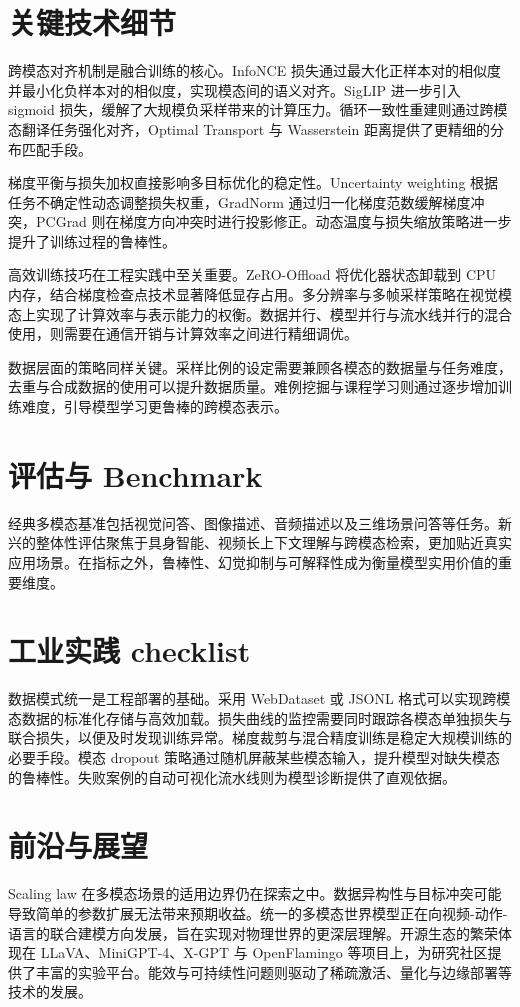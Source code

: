 \chapter{关键技术细节}
跨模态对齐机制是融合训练的核心。InfoNCE 损失通过最大化正样本对的相似度并最小化负样本对的相似度，实现模态间的语义对齐。SigLIP 进一步引入 sigmoid 损失，缓解了大规模负采样带来的计算压力。循环一致性重建则通过跨模态翻译任务强化对齐，Optimal Transport 与 Wasserstein 距离提供了更精细的分布匹配手段。\par
梯度平衡与损失加权直接影响多目标优化的稳定性。Uncertainty weighting 根据任务不确定性动态调整损失权重，GradNorm 通过归一化梯度范数缓解梯度冲突，PCGrad 则在梯度方向冲突时进行投影修正。动态温度与损失缩放策略进一步提升了训练过程的鲁棒性。\par
高效训练技巧在工程实践中至关重要。ZeRO-Offload 将优化器状态卸载到 CPU 内存，结合梯度检查点技术显著降低显存占用。多分辨率与多帧采样策略在视觉模态上实现了计算效率与表示能力的权衡。数据并行、模型并行与流水线并行的混合使用，则需要在通信开销与计算效率之间进行精细调优。\par
数据层面的策略同样关键。采样比例的设定需要兼顾各模态的数据量与任务难度，去重与合成数据的使用可以提升数据质量。难例挖掘与课程学习则通过逐步增加训练难度，引导模型学习更鲁棒的跨模态表示。\par
\chapter{评估与 Benchmark}
经典多模态基准包括视觉问答、图像描述、音频描述以及三维场景问答等任务。新兴的整体性评估聚焦于具身智能、视频长上下文理解与跨模态检索，更加贴近真实应用场景。在指标之外，鲁棒性、幻觉抑制与可解释性成为衡量模型实用价值的重要维度。\par
\chapter{工业实践 checklist}
数据模式统一是工程部署的基础。采用 WebDataset 或 JSONL 格式可以实现跨模态数据的标准化存储与高效加载。损失曲线的监控需要同时跟踪各模态单独损失与联合损失，以便及时发现训练异常。梯度裁剪与混合精度训练是稳定大规模训练的必要手段。模态 dropout 策略通过随机屏蔽某些模态输入，提升模型对缺失模态的鲁棒性。失败案例的自动可视化流水线则为模型诊断提供了直观依据。\par
\chapter{前沿与展望}
Scaling law 在多模态场景的适用边界仍在探索之中。数据异构性与目标冲突可能导致简单的参数扩展无法带来预期收益。统一的多模态世界模型正在向视频-动作-语言的联合建模方向发展，旨在实现对物理世界的更深层理解。开源生态的繁荣体现在 LLaVA、MiniGPT-4、X-GPT 与 OpenFlamingo 等项目上，为研究社区提供了丰富的实验平台。能效与可持续性问题则驱动了稀疏激活、量化与边缘部署等技术的发展。\par
